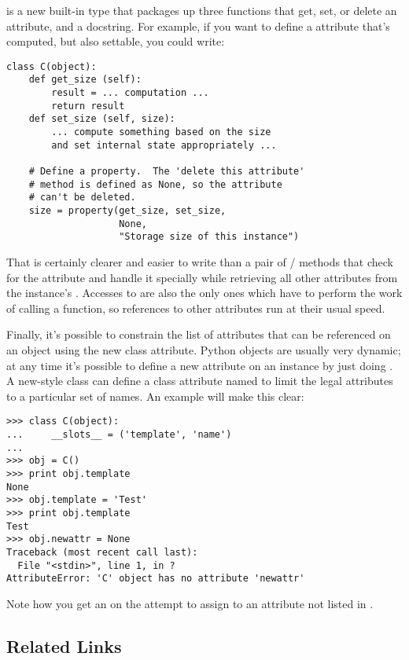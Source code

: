 \documentclass{howto}
\begin{document}
 is a new built-in type that packages up three
functions that get, set, or delete an attribute, and a docstring.  For
example, if you want to define a  attribute that's
computed, but also settable, you could write:

\begin{verbatim}
class C(object):
    def get_size (self):
        result = ... computation ...
        return result
    def set_size (self, size):
        ... compute something based on the size
        and set internal state appropriately ...

    # Define a property.  The 'delete this attribute'
    # method is defined as None, so the attribute
    # can't be deleted.
    size = property(get_size, set_size,
                    None,
                    "Storage size of this instance")
\end{verbatim}

That is certainly clearer and easier to write than a pair of
/ methods that check for the
 attribute and handle it specially while retrieving all
other attributes from the instance's .  Accesses to
 are also the only ones which have to perform the work of
calling a function, so references to other attributes run at
their usual speed.

Finally, it's possible to constrain the list of attributes that can be
referenced on an object using the new  class attribute.
Python objects are usually very dynamic; at any time it's possible to
define a new attribute on an instance by just doing
.   A new-style class can define a class attribute named
 to limit the legal attributes 
to a particular set of names.  An example will make this clear:

\begin{verbatim}
>>> class C(object):
...     __slots__ = ('template', 'name')
...
>>> obj = C()
>>> print obj.template
None
>>> obj.template = 'Test'
>>> print obj.template
Test
>>> obj.newattr = None
Traceback (most recent call last):
  File "<stdin>", line 1, in ?
AttributeError: 'C' object has no attribute 'newattr'
\end{verbatim}

Note how you get an  on the attempt to
assign to an attribute not listed in .



\subsection{Related Links}
\label{sect-rellinks}
\end{document}
